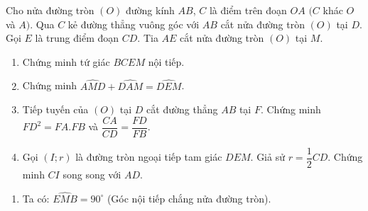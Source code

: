 \begin{ex}%
    Cho nửa đường tròn $(O)$ đường kính $AB$, $C$ là điểm trên đoạn $OA$ $(C$ khác $O$ và $A)$. Qua $C$ kẻ đường thẳng vuông góc với $AB$ cắt nửa đường tròn $(O)$ tại $D$. Gọi $E$ là trung điểm đoạn $CD$. Tia $AE$ cắt nửa đường tròn $(O)$ tại $M$.
    \begin{enumerate}
        \item Chứng minh tứ giác $BCEM$ nội tiếp.
        \item Chứng minh $\widehat {AMD} + \widehat {DAM} = \widehat {DEM}$.
        \item Tiếp tuyến của $(O)$ tại $D$ cắt đường thẳng $AB$ tại $F$. Chứng minh  $FD^2=FA.FB$ và $\dfrac{CA}{CD}=\dfrac{FD}{FB}$.
        \item Gọi $(I;r)$ là đường tròn ngoại tiếp tam giác $DEM$. Giả sử  $r= \dfrac{1}{2}CD$. Chứng minh $CI$ song song với $AD$.
    \end{enumerate}
\loigiai
    {
    \begin{center}
    \end{center}
    \begin{enumerate}
           \item Ta có: $\widehat{EMB}=90^\circ$ (Góc nội tiếp chắng nửa đường tròn).\\

\end{enumerate}}
\end{ex}
